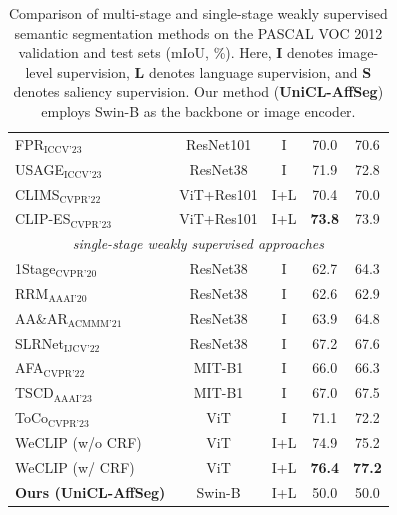 \begin{table}[!t]
\begin{tabular}{l c c c c}
        FPR$_{\text{ICCV'23}}$~\cite{wsss_fpr}        & ResNet101  & I    & 70.0          & 70.6          \\
        USAGE$_{\text{ICCV'23}}$~\cite{wsss_usage}    & ResNet38   & I    & 71.9          & 72.8          \\
        CLIMS$_{\text{CVPR'22}}$~\cite{wsss_clims}    & ViT+Res101 & I+L  & 70.4          & 70.0          \\
        CLIP-ES$_{\text{CVPR'23}}$~\cite{wsss_clip_es}                       & ViT+Res101 & I+L  & \textbf{73.8} & 73.9          \\
        \hline
        \multicolumn{5}{c}{\textit{single-stage weakly supervised approaches}}                                                   \\
        1Stage$_{\text{CVPR'20}}$~\cite{wsss_single_stage}                   & ResNet38   & I    & 62.7          & 64.3          \\
        RRM$_{\text{AAAI'20}}$~\cite{wsss_reliability_does_matter}           & ResNet38   & I    & 62.6          & 62.9          \\
        AA\&AR$_{\text{ACMMM'21}}$~\cite{wsss_aaar}                                 & ResNet38   & I    & 63.9          & 64.8          \\
        SLRNet$_{\text{IJCV'22}}$~\cite{wsss_slr_net}                                  & ResNet38   & I    & 67.2          & 67.6          \\
        AFA$_{\text{CVPR'22}}$~\cite{wsss_afa_affinity_from_attention}                                     & MIT-B1     & I    & 66.0          & 66.3          \\
        TSCD$_{\text{AAAI'23}}$~\cite{wsss_tscd}                                    & MIT-B1     & I    & 67.0          & 67.5          \\
        ToCo$_{\text{CVPR'23}}$~\cite{wsss_toco_token_contrast}                                    & ViT        & I    & 71.1          & 72.2          \\
        WeCLIP (w/o CRF)                                                & ViT        & I+L  & 74.9          & 75.2          \\
        WeCLIP (w/ CRF)                                                 & ViT        & I+L  & \textbf{76.4} & \textbf{77.2} \\
        \hline
        \textbf{Ours (UniCL-AffSeg)} & Swin-B & I+L & 50.0 & 50.0 \\
        \hline
    \end{tabular}
    \caption{
    Comparison of multi-stage and single-stage weakly supervised semantic segmentation methods on the PASCAL VOC 2012 validation and test sets (mIoU, \%). 
    Here, \textbf{I} denotes image-level supervision, \textbf{L} denotes language supervision, and \textbf{S} denotes saliency supervision. 
    Our method (\textbf{UniCL-AffSeg}) employs Swin-B as the backbone or image encoder.
    }
    \label{tab:quantitative_results}
\end{table}

